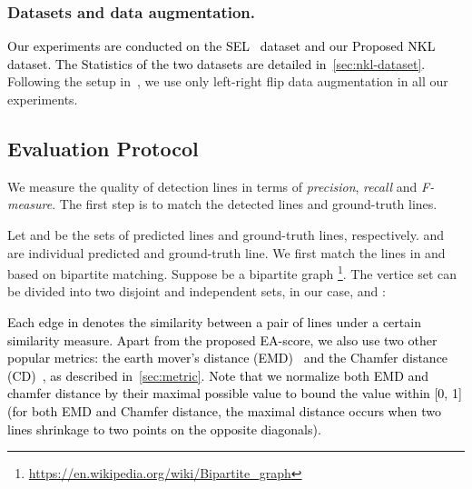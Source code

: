 \documentclass[10pt,journal,cspaper,compsoc]{IEEEtran}
\newcommand{\revise}[1]{{\textcolor{black}{#1}}}
\newcommand{\rerevise}[1]{{\textcolor{black}{#1}}}
\newcommand{\CheckRmv}[1]{}
\newcommand{\CheckRmv}[1]{#1}
\begin{document}
\CheckRmv{
\begin{figure*}[htb!]
  \centering
  \begin{overpic}[width=0.9\linewidth]{figures/search_theta_r_pami.pdf}
    \put(95,1){}
    \put(45,1){}
  \end{overpic}\vspace{-10pt}
  \caption{
    Left: performance under different distance quantization intervals  with a fixed
         angular quantization interval .
Larger  indicates less quantization levels .
    Right: performance under different angular quantization intervals  with a fixed
        distance quantization interval .
  }\label{fig:ablation-interval}
\end{figure*}
}

\subsubsection{Datasets and data augmentation.}
\revise{Our experiments are conducted on the 
SEL~\cite{lee2017semantic} dataset and our Proposed
NKL dataset.}
\revise{The Statistics of the two datasets are detailed in~\cref{sec:nkl-dataset}.}
Following the setup in~\cite{lee2017semantic}, we use only left-right flip
data augmentation in all our experiments.

\subsection{Evaluation Protocol}
We measure the quality of detection lines in terms of \emph{precision},
\emph{recall} and \emph{F-measure}.
The first step is to match the detected lines and ground-truth lines.

Let  and  be the sets of predicted lines
and ground-truth lines, respectively.
 and  are individual predicted and ground-truth line.
We first match the lines in  and  based on bipartite matching.
Suppose  be a bipartite graph
\footnote{\url{https://en.wikipedia.org/wiki/Bipartite_graph}}.
The vertice set  can be divided into two disjoint and independent sets,
in our case,  and :


\rerevise{
Each edge in  denotes the similarity between a pair of lines under 
a certain similarity measure.
Apart from the proposed EA-score, we also use two other popular metrics:
the earth mover's distance (EMD)~\cite{rubner2000earth} and the Chamfer distance (CD)~\cite{borgefors1986distance}, as described in~\cref{sec:metric}.
Note that we normalize both EMD and chamfer distance by their maximal possible
value to bound the value
within [0, 1] (for both EMD and Chamfer distance, the maximal distance occurs when
two lines shrinkage to two points on the opposite diagonals).}
\end{document}
